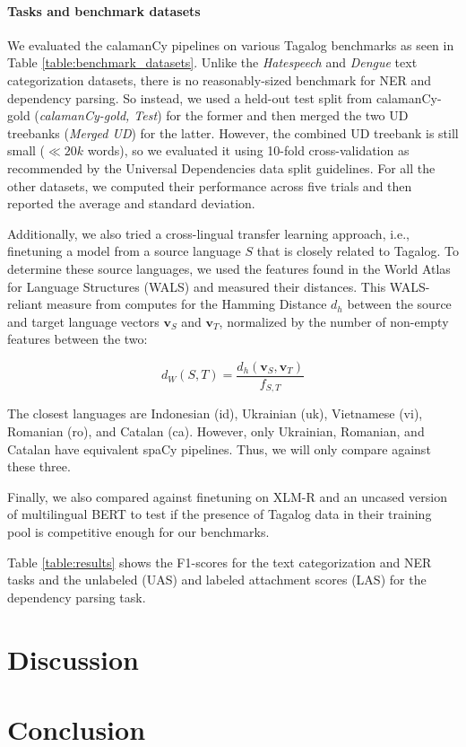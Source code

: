 \documentclass[11pt]{article}
\begin{document}
\paragraph*{Tasks and benchmark datasets} 
We evaluated the calamanCy pipelines on various Tagalog benchmarks as seen in Table \ref{table:benchmark_datasets}.
Unlike the \textit{Hatespeech} and \textit{Dengue} text categorization datasets, there is no reasonably-sized benchmark for NER and dependency parsing.
So instead, we used a held-out test split from calamanCy-gold (\textit{calamanCy-gold, Test}) for the former and then merged the two UD treebanks (\textit{Merged UD}) for the latter. 
However, the combined UD treebank is still small ($\ll 20k$ words), so we evaluated it using 10-fold cross-validation as recommended by the Universal Dependencies data split guidelines.
For all the other datasets, we computed their performance across five trials and then reported the average and standard deviation.

Additionally, we also tried a cross-lingual transfer learning approach, i.e., finetuning a model from a source language $S$ that is closely related to Tagalog.
To determine these source languages, we used the features found in the World Atlas for Language Structures (WALS) \citep{Haspelmath2005WALS} and measured their distances.
This WALS-reliant measure from \citet{Agic2017CrossLingualPS} computes for the Hamming Distance $d_h$ between the source and target language vectors $\mathbf{v}_S$ and $\mathbf{v}_T$, normalized by the number of non-empty features between the two:

$$
d_W(S,T) = \dfrac{d_h(\mathbf{v}_S,\mathbf{v}_T)}{f_{S,T}}
$$

The closest languages are Indonesian (id), Ukrainian (uk), Vietnamese (vi), Romanian (ro), and Catalan (ca).
However, only Ukrainian, Romanian, and Catalan have equivalent spaCy pipelines.
Thus, we will only compare against these three.

Finally, we also compared against finetuning on XLM-R \citep{Conneau2019UnsupervisedCR} and an uncased version of multilingual BERT \citep{Devlin2019BERTPO} to test if the presence of Tagalog data in their training pool is competitive enough for our benchmarks. 


Table \ref{table:results} shows the F1-scores for the text categorization and NER tasks and the unlabeled (UAS) and labeled attachment scores (LAS) for the dependency parsing task.

\section{Discussion}


\section{Conclusion}







\end{document}

